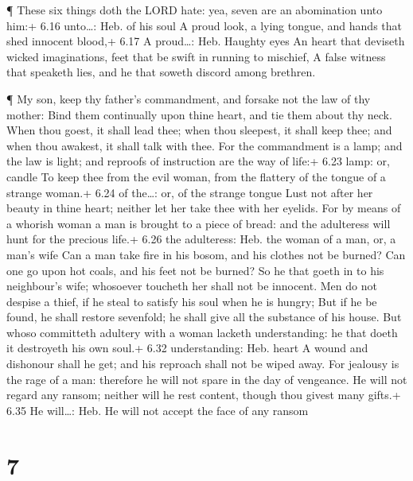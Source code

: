  ¶ These six things doth the LORD hate: yea, seven are an
abomination unto him:+ 6.16 unto\ldots: Heb. of his soul  A
proud look, a lying tongue, and hands that shed innocent blood,+ 6.17 A
proud\ldots: Heb. Haughty eyes  An heart that deviseth
wicked imaginations, feet that be swift in running to mischief,
 A false witness that speaketh lies, and he that soweth
discord among brethren.

 ¶ My son, keep thy father's commandment, and forsake not
the law of thy mother:  Bind them continually upon thine
heart, and tie them about thy neck.  When thou goest, it
shall lead thee; when thou sleepest, it shall keep thee; and when thou
awakest, it shall talk with thee.  For the commandment is a
lamp; and the law is light; and reproofs of instruction are the way of
life:+ 6.23 lamp: or, candle  To keep thee from the evil
woman, from the flattery of the tongue of a strange woman.+ 6.24 of
the\ldots: or, of the strange tongue  Lust not after her
beauty in thine heart; neither let her take thee with her eyelids.
 For by means of a whorish woman a man is brought to a
piece of bread: and the adulteress will hunt for the precious life.+
6.26 the adulteress: Heb. the woman of a man, or, a man's wife
 Can a man take fire in his bosom, and his clothes not be
burned?  Can one go upon hot coals, and his feet not be
burned?  So he that goeth in to his neighbour's wife;
whosoever toucheth her shall not be innocent.  Men do not
despise a thief, if he steal to satisfy his soul when he is hungry;
 But if he be found, he shall restore sevenfold; he shall
give all the substance of his house.  But whoso committeth
adultery with a woman lacketh understanding: he that doeth it destroyeth
his own soul.+ 6.32 understanding: Heb. heart  A wound and
dishonour shall he get; and his reproach shall not be wiped away.
 For jealousy is the rage of a man: therefore he will not
spare in the day of vengeance.  He will not regard any
ransom; neither will he rest content, though thou givest many gifts.+
6.35 He will\ldots: Heb. He will not accept the face of any ransom

\hypertarget{section-6}{%
\section{7}\label{section-6}}

